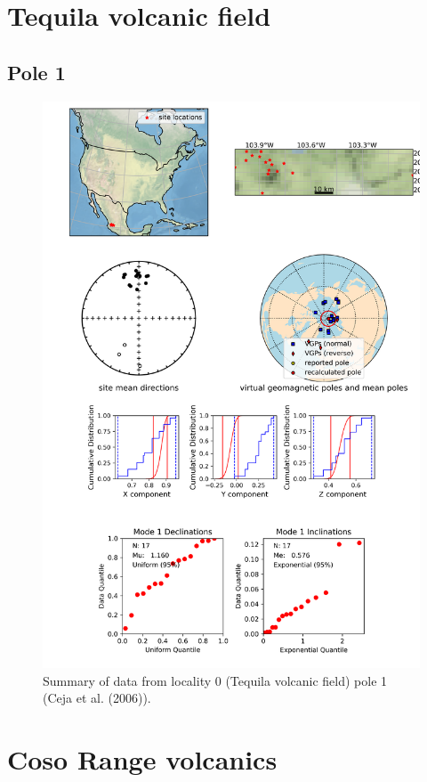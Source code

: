 \documentclass{article}
\begin{document}
\section{Tequila volcanic field}
\subsection{Pole 1}


\begin{figure}[H]
\centering
\includegraphics[width=5 in]{./0/1/pole_summary.png}
\caption{Summary of data from locality 0 (Tequila volcanic field) pole 1 (Ceja et al. (2006)).}
\end{figure}

\section{Coso Range volcanics}
\end{document}
